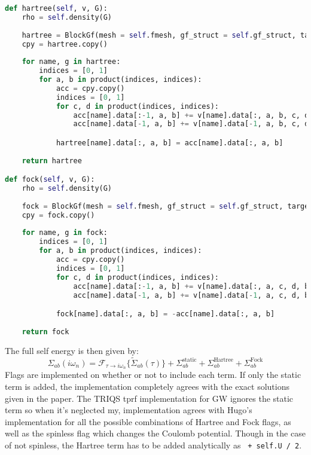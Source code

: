 \documentclass[12pt]{article}
\begin{document}
\begin{lstlisting}[language=Python]
def hartree(self, v, G):
    rho = self.density(G)
    
    hartree = BlockGf(mesh = self.fmesh, gf_struct = self.gf_struct, target_rank = 2)
    cpy = hartree.copy()
            
    for name, g in hartree:
        indices = [0, 1]
        for a, b in product(indices, indices):
            acc = cpy.copy()          
            indices = [0, 1]
            for c, d in product(indices, indices):
                acc[name].data[:-1, a, b] += v[name].data[:, a, b, c, d] * rho[name].data[:, c, d]
                acc[name].data[-1, a, b] += v[name].data[-1, a, b, c, d] * rho[name].data[-1, c, d]

            hartree[name].data[:, a, b] = acc[name].data[:, a, b]
                
    return hartree

def fock(self, v, G):
    rho = self.density(G)
    
    fock = BlockGf(mesh = self.fmesh, gf_struct = self.gf_struct, target_rank = 2)
    cpy = fock.copy()
            
    for name, g in fock:
        indices = [0, 1]
        for a, b in product(indices, indices):
            acc = cpy.copy()          
            indices = [0, 1]
            for c, d in product(indices, indices):
                acc[name].data[:-1, a, b] += v[name].data[:, a, c, d, b] * rho[name].data[:, d, c]
                acc[name].data[-1, a, b] += v[name].data[-1, a, c, d, b] * rho[name].data[-1, d, c]

            fock[name].data[:, a, b] = -acc[name].data[:, a, b]
                
    return fock
\end{lstlisting}
\newpage
\noindent
The full self energy is then given by:
\begin{equation}
\Sigma_{ab}(i\omega_n)=\mathcal{F}_{\tau\to i\omega_n}\{\tilde{\Sigma}_{ab}(\tau)\}+\Sigma^\text{static}_{ab}+\Sigma^\text{Hartree}_{ab}+\Sigma^\text{Fock}_{ab}
\end{equation}
Flags are implemented on whether or not to include each term. If only the static term is added, the implementation completely agrees with the exact solutions given in the paper. The TRIQS tprf implementation for GW ignores the static term so when it's neglected my, implementation agrees with Hugo's implementation for all the possible combinations of Hartree and Fock flags, as well as the spinless flag which changes the Coulomb potential. Though in the case of not spinless, the Hartree term has to be added analytically as \texttt{ + self.U / 2}.\\
\end{document}
